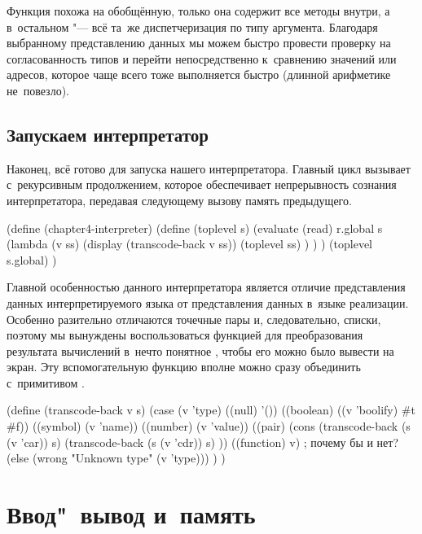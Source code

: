 Функция  похожа на обобщённую, только она содержит все методы внутри,
а в~остальном "--- всё та~же диспетчеризация по типу аргумента. Благодаря
выбранному представлению данных мы можем быстро провести проверку на
согласованность типов и перейти непосредственно к~сравнению значений или
адресов, которое чаще всего тоже выполняется быстро (длинной арифметике
не~повезло).


\subsection{Запускаем интерпретатор}%
\label{assignment/implementation/ssect:starting}

Наконец, всё готово для запуска нашего интерпретатора. Главный цикл вызывает
 с~рекурсивным продолжением, которое обеспечивает непрерывность
сознания интерпретатора, передавая следующему вызову память предыдущего.

\begin{code:lisp}
(define (chapter4-interpreter)
  (define (toplevel s)
    (evaluate (read) r.global s
              (lambda (v ss)
                (display (transcode-back v ss))
                (toplevel ss) ) ) )
  (toplevel s.global) )
\end{code:lisp}

Главной особенностью данного интерпретатора является отличие представления
данных интерпретируемого языка от представления данных в~языке реализации.
Особенно разительно отличаются точечные пары и, следовательно, списки, поэтому
мы вынуждены воспользоваться функцией  для преобразования
результата вычислений в~нечто понятное , чтобы его можно было
вывести на экран. Эту вспомогательную функцию вполне можно сразу объединить
с~примитивом .

\begin{code:lisp}
(define (transcode-back v s)
  (case (v 'type)
    ((null)     '())
    ((boolean)  ((v 'boolify) #t #f))
    ((symbol)   (v 'name))
    ((number)   (v 'value))
    ((pair)     (cons (transcode-back (s (v 'car)) s)
                      (transcode-back (s (v 'cdr)) s) ))
    ((function) v)  ; почему бы и нет?
    (else       (wrong "Unknown type" (v 'type))) ) )
\end{code:lisp}


\section{Ввод"~вывод и~память}\label{assignment/sect:io-and-memory}

